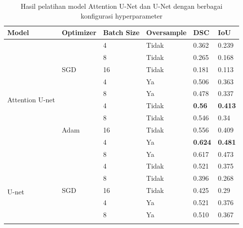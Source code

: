 \begin{table}[H]
	\caption{Hasil pelatihan model Attention U-Net dan U-Net dengan berbagai konfigurasi hyperparameter}
	\label{tab:training-results}
	\begin{tabular}{llllll}
		\hline
		Model                             & Optimizer             & Batch Size & Oversample & DSC            & IoU            \\ \hline
		\multirow{10}{*}{Attention U-net} & \multirow{5}{*}{SGD}  & 4          & Tidak      & 0.362          & 0.239          \\
		&                       & 8          & Tidak      & 0.265          & 0.168          \\
		&                       & 16         & Tidak      & 0.181          & 0.113          \\ \cline{3-6} 
		&                       & 4          & Ya         & 0.506          & 0.363          \\
		&                       & 8          & Ya         & 0.478          & 0.337          \\ \cline{2-6} 
		& \multirow{5}{*}{Adam} & 4          & Tidak      & \textbf{0.56}  & \textbf{0.413} \\
		&                       & 8          & Tidak      & 0.546          & 0.34           \\
		&                       & 16         & Tidak      & 0.556          & 0.409          \\ \cline{3-6} 
		&                       & 4          & Ya         & \textbf{0.624} & \textbf{0.481} \\
		&                       & 8          & Ya         & 0.617          & 0.473          \\ \hline
		\multirow{10}{*}{U-net}           & \multirow{5}{*}{SGD}  & 4          & Tidak      & 0.521          & 0.375          \\
		&                       & 8          & Tidak      & 0.396          & 0.268          \\
		&                       & 16         & Tidak      & 0.425          & 0.29           \\ \cline{3-6} 
		&                       & 4          & Ya         & 0.521          & 0.376          \\
		&                       & 8          & Ya         & 0.510          & 0.367          \\ \cline{2-6} 

\end{tabular}
\end{table}
